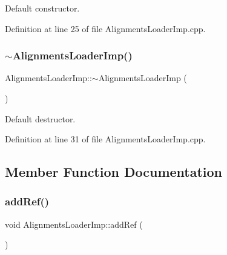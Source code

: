 Default constructor. 



Definition at line 25 of file Alignments\+Loader\+Imp.\+cpp.

\hypertarget{class_d_d4hep_1_1_conditions_1_1_alignments_loader_imp_a6d54425e5976b7e45f5e99722fcbbbff}{}\label{class_d_d4hep_1_1_conditions_1_1_alignments_loader_imp_a6d54425e5976b7e45f5e99722fcbbbff} 
\subsubsection{\texorpdfstring{$\sim$\+Alignments\+Loader\+Imp()}{~AlignmentsLoaderImp()}}
{\footnotesize\ttfamily Alignments\+Loader\+Imp\+::$\sim$\+Alignments\+Loader\+Imp (\begin{DoxyParamCaption}{ }\end{DoxyParamCaption})\hspace{0.3cm}{\ttfamily [virtual]}}



Default destructor. 



Definition at line 31 of file Alignments\+Loader\+Imp.\+cpp.



\subsection{Member Function Documentation}
\hypertarget{class_d_d4hep_1_1_conditions_1_1_alignments_loader_imp_ac4797b3da6e5543cf505eca8bf9cb405}{}\label{class_d_d4hep_1_1_conditions_1_1_alignments_loader_imp_ac4797b3da6e5543cf505eca8bf9cb405} 
\subsubsection{\texorpdfstring{add\+Ref()}{addRef()}}
{\footnotesize\ttfamily void Alignments\+Loader\+Imp\+::add\+Ref (\begin{DoxyParamCaption}{ }\end{DoxyParamCaption})\hspace{0.3cm}{\ttfamily [virtual]}}



